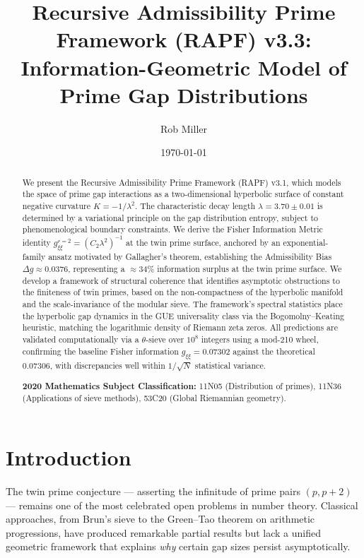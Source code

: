 \documentclass[12pt]{article}
\title{Recursive Admissibility Prime Framework (RAPF) v3.3:\\
Information-Geometric Model of Prime Gap Distributions}
\author{Rob Miller}
\date{\today}
\begin{document}
\maketitle

\begin{abstract}
We present the Recursive Admissibility Prime Framework (RAPF) v3.1, which
models the space of prime gap interactions as a two-dimensional hyperbolic
surface of constant negative curvature $K = -1/\lambda^2$. The characteristic
decay length $\lambda = 3.70 \pm 0.01$ is determined by a variational principle
on the gap distribution entropy, subject to phenomenological boundary constraints.
We derive the Fisher Information Metric identity $g_{\xi\xi}^{r=2} = (C_2 \lambda^2)^{-1}$
at the twin prime surface, anchored by an exponential-family ansatz motivated
by Gallagher's theorem, establishing the Admissibility Bias $\Delta g \approx 0.0376$, representing a $\approx 34\%$ information surplus at the twin prime surface.
We develop a framework of structural coherence that identifies asymptotic
obstructions to the finiteness of twin primes, based on the non-compactness of
the hyperbolic manifold and the scale-invariance of the modular sieve. The
framework's spectral statistics place the hyperbolic gap dynamics in the GUE
universality class via the Bogomolny--Keating heuristic, matching the logarithmic
density of Riemann zeta zeros. All predictions are validated computationally via
a $\theta$-sieve over $10^8$ integers using a mod-210 wheel, confirming the
baseline Fisher information $g_{\xi\xi} = 0.07302$ against the theoretical
$0.07306$, with discrepancies well within $1/\sqrt{N}$ statistical variance.

\vspace{0.2cm}
\noindent\textbf{2020 Mathematics Subject Classification:} 11N05 (Distribution of primes),
11N36 (Applications of sieve methods), 53C20 (Global Riemannian geometry).
\end{abstract}

\tableofcontents
\newpage

\section{Introduction}

The twin prime conjecture --- asserting the infinitude of prime pairs $(p, p+2)$
--- remains one of the most celebrated open problems in number theory. Classical
approaches, from Brun's sieve to the Green--Tao theorem on arithmetic progressions,
have produced remarkable partial results but lack a unified geometric framework that
explains \textit{why} certain gap sizes persist asymptotically.
\end{document}
